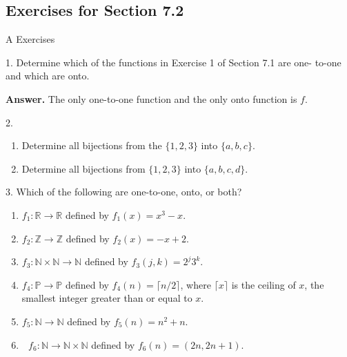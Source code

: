 \documentclass[10pt,]{book}
\theoremstyle{plain}
\theoremstyle{definition}
\theoremstyle{definition}
\theoremstyle{definition}
\begin{document}
\subsection[Exercises for Section 7.2 ]{Exercises for Section 7.2 }\label{exercises-7-2}
\hypertarget{exercisegroup-3}{}\typeout{************************************************}
\typeout{************************************************}
A Exercises%
\begin{exercisegroup}
\item[1.]\hypertarget{exercise-9}{} Determine which of the functions in Exercise 1 of Section 7.1 are one- to-one and which are onto.%
\par\smallskip
\par\smallskip
\noindent\textbf{Answer.}\hypertarget{answer-4}{}\quad
 The only one-to-one function and the only onto function is \(f\).%
\item[2.]\hypertarget{exercise-10}{}\leavevmode%
\begin{enumerate}[label=\alph*]
\item\hypertarget{li-29}{} Determine all bijections from the \(\{1, 2, 3\}\) into \(\{a, b, c\}\).%
\item\hypertarget{li-30}{}Determine all bijections from \(\{1, 2, 3\}\) into \(\{a, b, c, d\}\).%
\end{enumerate}
%
\par\smallskip
\item[3.]\hypertarget{exercise-11}{} Which of the following are one-to-one, onto, or both?%
\par
\leavevmode%
\begin{enumerate}[label=\alph*]
\item\hypertarget{li-31}{} \(f_1:\mathbb{R} \rightarrow \mathbb{R}\) defined by \(f_1(x) = x^3 - x\).%
\item\hypertarget{li-32}{} \(f_2 :\mathbb{Z} \rightarrow  \mathbb{Z}\) defined by \(f_2(x)= -x + 2\).%
\item\hypertarget{li-33}{} \(f_3:\mathbb{N} \times \mathbb{N}\to \mathbb{N}\) defined by \(f_3(j, k) =2^j3^k\).%
\item\hypertarget{li-34}{} \(f_4 :\mathbb{P} \rightarrow  \mathbb{P}\) defined by \(f_4(n)=\lceil n/2\rceil\), where \(\lceil x\rceil\) is the ceiling of \(x\),
the smallest integer greater than or equal to \(x\).%
\item\hypertarget{li-35}{} \(f_5 :\mathbb{N} \rightarrow  \mathbb{N}\) defined by \(f_5(n)=n^2+n\).%
\item\hypertarget{li-36}{}\(\text{  }f_6:\mathbb{N} \rightarrow  \mathbb{N} \times  \mathbb{N}\) defined by \(f_6(n)= (2n, 2n+1)\).%

\end{enumerate}
\end{exercisegroup}
\end{document}
